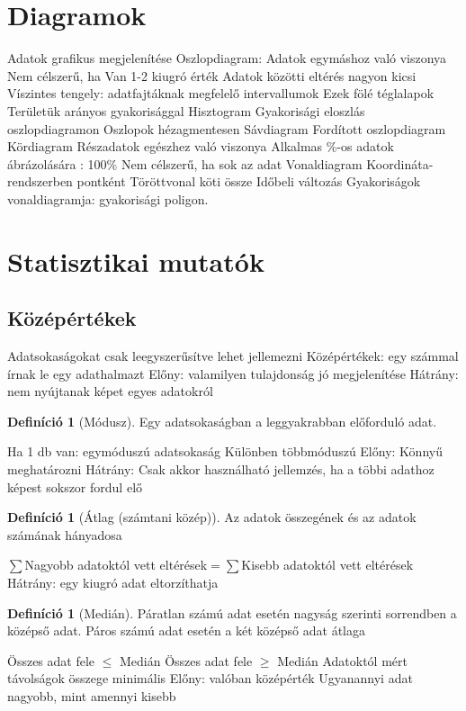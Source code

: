 \documentclass[twoside,12pt]{report}
\theoremstyle{definition}
\newtheorem{definition}[theorem]{Definíció}
\begin{document}
\section{Diagramok}
	\begin{outline}
		\1 Adatok grafikus megjelenítése
		\1 Oszlopdiagram:
			\2 Adatok egymáshoz való viszonya
			\2 Nem célszerű, ha
				\3 Van 1-2 kiugró érték
				\3 Adatok közötti eltérés nagyon kicsi
			\2 Víszintes tengely: adatfajtáknak megfelelő intervallumok
				\3 Ezek fölé téglalapok
				\3 Területük arányos gyakorisággal
		\1 Hisztogram
			\2 Gyakorisági eloszlás oszlopdiagramon
			\2 Oszlopok hézagmentesen
		\1 Sávdiagram
			\2 Fordított oszlopdiagram
		\1 Kördiagram
			\2 Részadatok egészhez való viszonya
			\2 Alkalmas \%-os adatok ábrázolására
				\degree: 100\%
			\2 Nem célszerű, ha sok az adat
		\1 Vonaldiagram
			\2 Koordináta-rendszerben pontként
			\2 Töröttvonal köti össze
			\2 Időbeli változás
			\2 Gyakoriságok vonaldiagramja: gyakorisági poligon.
	\end{outline}
\section{Statisztikai mutatók}
	\subsection{Középértékek}
	\begin{outline}
		\1 Adatsokaságokat csak leegyszerűsítve lehet jellemezni
			\2 Középértékek: egy számmal írnak le egy adathalmazt
			\2 Előny: valamilyen tulajdonság jó megjelenítése
			\2 Hátrány: nem nyújtanak képet egyes adatokról
	\end{outline}
\pagebreak
	\begin{outline}
		\1[] \begin{definition}[Módusz]
				Egy adatsokaságban a leggyakrabban előforduló adat.
			\end{definition}
			\2 Ha 1 db van: egymóduszú adatsokaság
				\3 Különben többmóduszú
			\2 Előny: Könnyű meghatározni
			\2 Hátrány: Csak akkor használható jellemzés, ha a többi adathoz képest sokszor fordul elő
		\1[] \begin{definition}[Átlag (számtani közép)]
				Az adatok összegének és az adatok számának hányadosa
			\end{definition}
			\2 $\sum$Nagyobb adatoktól vett eltérések$=\sum$Kisebb adatoktól vett eltérések
			\2 Hátrány: egy kiugró adat eltorzíthatja
		\1[] \begin{definition}[Medián]
			Páratlan számú adat esetén nagyság szerinti sorrendben a középső adat. Páros számú adat esetén a két középső adat átlaga
		\end{definition}
			\2 Összes adat fele $\le$ Medián
			\2 Összes adat fele $\ge$ Medián
			\2 Adatoktól mért távolságok összege minimális
			\2 Előny: valóban középérték
				\3 Ugyanannyi adat nagyobb, mint amennyi kisebb
	\end{outline}
\end{document}
